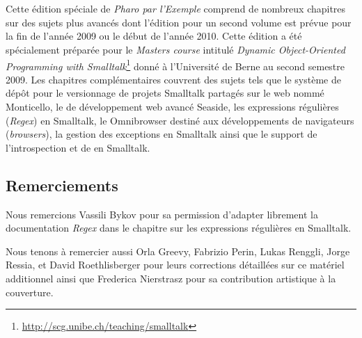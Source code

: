 \documentclass[a4paper,10pt,twoside]{book}
\begin{document}
	\sloppy
	\frontmatter
\fi
\chapter{}
\newcommand{\web}{web\xspace}

Cette édition spéciale de \emph{Pharo par l'Exemple} comprend de
nombreux chapitres sur des sujets plus avancés
dont l'édition pour un second volume est prévue pour la fin de l'année
2009 ou le début de l'année 2010.
Cette édition a été spécialement préparée pour le 
\emph{Masters course} intitulé \emph{Dynamic Object-Oriented
  Programming with
  Smalltalk}\footnote{\url{http://scg.unibe.ch/teaching/smalltalk}}
donné à l'Université de Berne au second semestre 2009.
Les chapitres complémentaires couvrent des sujets tels que le système
de dépôt pour le versionnage de projets Smalltalk partagés sur le \web
nommé Monticello,
le \framework de développement \web avancé Seaside,
les expressions régulières (\emph{Regex}) en Smalltalk,
le \framework Omnibrowser destiné aux développements de navigateurs
(\emph{browsers}),
la gestion des exceptions en Smalltalk ainsi que le support de
l'introspection et de  en Smalltalk.

\section*{Remerciements}

Nous remercions Vassili Bykov pour sa permission d'adapter librement
la documentation \emph{Regex} dans le chapitre sur les expressions
régulières en Smalltalk.

Nous tenons à remercier aussi
Orla Greevy,
Fabrizio Perin,
Lukas Renggli,
Jorge Ressia,
et
David Roethlisberger
pour leurs corrections détaillées sur ce matériel additionnel
ainsi que Frederica Nierstrasz pour sa contribution 
artistique à la couverture.




\ifx\wholebook\relax\else
   
   
\end{document}

